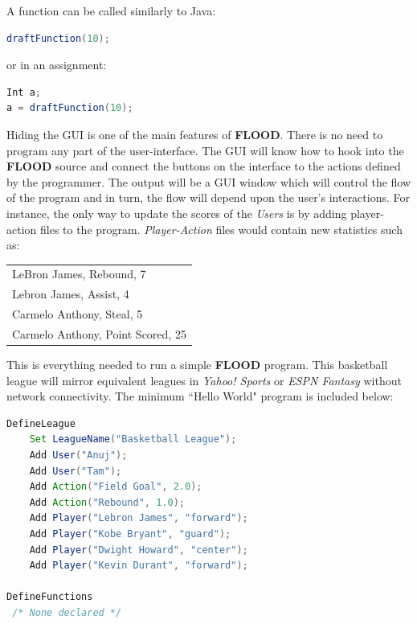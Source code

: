 \documentclass[12pt]{report}
\begin{document}
A function can be called similarly to Java:

\begin{singlespace}
\begin{lstlisting}[language=Java,label=some-code,caption=Function call]
draftFunction(10);
\end{lstlisting}
\end{singlespace}

or in an assignment:

\begin{singlespace}
\begin{lstlisting}[language=Java,label=some-code,caption=Function call in an assignment]
Int a;
a = draftFunction(10);
\end{lstlisting}
\end{singlespace}

Hiding the GUI is one of the main features of \textbf{FLOOD}. There is no need to program any part of the user-interface. The GUI will know how to hook into the \textbf{FLOOD} source and connect the buttons on the interface to the actions defined by the programmer. The output will be a GUI window which will control the flow of the program and in turn, the flow will depend upon the user's interactions. For instance, the only way to update the scores of the \textit{Users} is by adding player-action files to the program. \textit{Player-Action} files would contain new statistics such as:
\begin{center}
\begin{singlespace}
\begin{tabular}{ l }
LeBron James, Rebound, 7 \\
Lebron James, Assist, 4  \\
Carmelo Anthony, Steal, 5 \\
Carmelo Anthony, Point Scored, 25
\end{tabular}
\end{singlespace}
\end{center}

This is everything needed to run a simple \textbf{FLOOD} program. This basketball league will mirror equivalent leagues in \textit{Yahoo! Sports} or \textit{ESPN Fantasy} without network connectivity. The minimum ``Hello World" program is included below:

\begin{singlespace}
\begin{lstlisting}[language=Java,label=some-code,caption=Minimal FLOOD program to create a basektball fantasy league]
DefineLeague
	Set LeagueName("Basketball League");
	Add User("Anuj");
	Add User("Tam");
	Add Action("Field Goal", 2.0);
	Add Action("Rebound", 1.0);
	Add Player("Lebron James", "forward");
	Add Player("Kobe Bryant", "guard");
	Add Player("Dwight Howard", "center");
	Add Player("Kevin Durant", "forward");

DefineFunctions
 /* None declared */
\end{lstlisting}
\end{singlespace}
\end{document}
